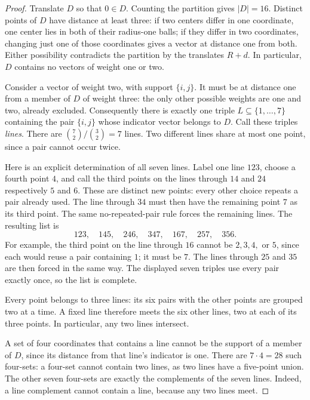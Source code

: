 \documentclass[11pt]{article}
\numberwithin{equation}{section}
\theoremstyle{definition}
\theoremstyle{remark}\newtheorem{remark}[theorem]{Remark}
\begin{document}
\begin{proof}
Translate $D$ so that $0\in D$.  Counting the partition gives $|D|=16$.
Distinct points of $D$ have distance at least three: if two centers differ
in one coordinate, one center lies in both of their radius-one balls; if
they differ in two coordinates, changing just one of those coordinates
gives a vector at distance one from both.  Either possibility contradicts
the partition by the translates $R+d$.  In particular, $D$ contains no vectors of weight one or two.

Consider a vector of weight two, with support $\{i,j\}$.  It must be at
distance one from a member of $D$ of weight three: the only other possible
weights are one and two, already excluded.  Consequently there is exactly
one triple $L\subseteq\{1,\ldots,7\}$ containing the pair $\{i,j\}$
whose indicator vector belongs to $D$.  Call these triples \emph{lines}.
There are $\binom72/\binom32=7$ lines.  Two different lines share at
most one point, since a pair cannot occur twice.

Here is an explicit determination of all seven lines.  Label one line
$123$, choose a fourth point $4$, and call the third points on the lines
through $14$ and $24$ respectively $5$ and $6$.  These are distinct new
points: every other choice repeats a pair already used.  The line through
$34$ must then have the remaining point $7$ as its third point.  The same
no-repeated-pair rule forces the remaining lines.  The resulting list is
\[
 123,\quad145,\quad246,\quad347,\quad167,\quad257,\quad356.       \tag{*}
\]
For example, the third point on the line through $16$ cannot be $2,3,4,$
or $5$, since each would reuse a pair containing $1$; it must be $7$.
The lines through $25$ and $35$ are then forced in the same way.
The displayed seven triples use every pair exactly once, so the list is
complete.

Every point belongs to three lines: its six pairs with the other points
are grouped two at a time.  A fixed line therefore meets the six other
lines, two at each of its three points.  In particular, any two lines
intersect.

A set of four coordinates that contains a line cannot be the support of
a member of $D$, since its distance from that line's indicator is one.
There are $7\cdot4=28$ such four-sets: a four-set cannot contain two lines,
as two lines have a five-point union.  The other seven four-sets are
exactly the complements of the seven lines.  Indeed, a line complement
cannot contain a line, because any two lines meet.


\end{proof}
\end{document}
